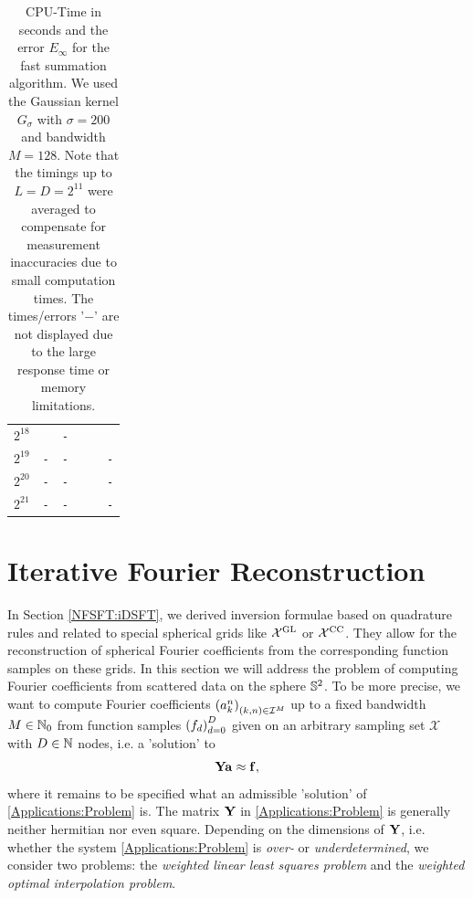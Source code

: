 \begin{table}[ht]
\begin{center}
\begin{tabular}{r|r|r|r|r|r}
        $2^{18}$ & \verb#2.6E+04# & \verb#-#       & \verb#4.6E+02# & \verb#7.5E+00# & \verb#1.9E-15# \\
        $2^{19}$ & \verb#-#       & \verb#-#       & \verb#9.1E+02# & \verb#1.4E+01# & \verb#-# \\
        $2^{20}$ & \verb#-#       & \verb#-#       & \verb#1.8E+03# & \verb#2.8E+01# & \verb#-# \\
        $2^{21}$ & \verb#-#       & \verb#-#       & \verb#3.6E+03# & \verb#5.5E+01# & \verb#-# \\
    \end{tabular}
  \end{center}
  \caption{CPU-Time in seconds and the error $E_{\infty}$ for the fast summation algorithm. We used 
    the Gaussian kernel $G_{\sigma}$ with $\sigma=200$ and bandwidth $M = 128$. Note that the timings 
    up to $L=D=2^{11}$ were
    averaged to compensate for measurement inaccuracies due to small computation times. The
    times/errors '$-$' are not displayed due to the large response time or memory limitations.}
  \label{tab:TimeSpace}
\end{table}


\section{Iterative Fourier Reconstruction}

In Section \ref{NFSFT:iDSFT}, we derived
inversion formulae based on quadrature rules and related to special spherical 
grids like $\mathcal{X^{\mbox{\scriptsize\rm{GL}}}}$ or $\mathcal{X^{\mbox{\scriptsize\rm{CC}}}}$. They allow for the 
reconstruction of spherical Fourier coefficients from the corresponding
function samples on these grids.
In this section we will address the problem of computing Fourier coefficients from
scattered data on the sphere $\mathbb{S}^2$. To be more precise, we want to compute 
Fourier coefficients $\left(a_{k}^n\right)_{(k,n) \in \mathcal{I}^M}$ up to a fixed 
bandwidth $M \in \mathbb{N}_{0}$ from function samples $\left(f_{d}\right)_{d=0}^D$ given on an
arbitrary sampling set $\mathcal{X}$ with $D \in \mathbb{N}$ nodes, i.e. a 'solution' to
\begin{equation}
  \label{Applications:Problem}
  \mathbf{Y} \mathbf{a} \approx \mathbf{f},
\end{equation}
where it remains to be specified what an admissible 'solution' of 
\eqref{Applications:Problem} is.
The matrix $\mathbf{Y}$ in \eqref{Applications:Problem} is generally 
neither hermitian nor even square. Depending on the dimensions of $\mathbf{Y}$, i.e.
whether the system \eqref{Applications:Problem} is \emph{over-} or 
\emph{underdetermined}, we consider two problems: the 
\emph{weighted linear least squares problem} and the
\emph{weighted optimal interpolation problem}.

